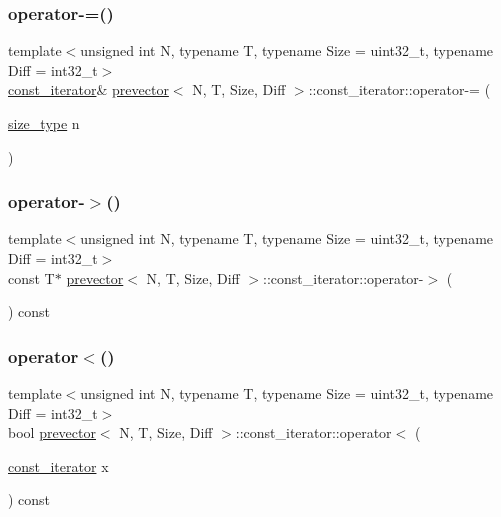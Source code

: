 \subsubsection{\texorpdfstring{operator-\/=()}{operator-=()}}
{\footnotesize\ttfamily template$<$unsigned int N, typename T, typename Size = uint32\+\_\+t, typename Diff = int32\+\_\+t$>$ \\
\mbox{\hyperlink{classprevector_1_1const__iterator}{const\+\_\+iterator}}\& \mbox{\hyperlink{classprevector}{prevector}}$<$ N, T, Size, Diff $>$\+::const\+\_\+iterator\+::operator-\/= (\begin{DoxyParamCaption}\item[{\mbox{\hyperlink{classprevector_a7e0da95e6d1c878f6eeb572f4fc12524}{size\+\_\+type}}}]{n }\end{DoxyParamCaption})\hspace{0.3cm}{\ttfamily [inline]}}

\mbox{\label{classprevector_1_1const__iterator_ae3f7014dba7dfa630b1f094bb53074ac}} 
\subsubsection{\texorpdfstring{operator-\/$>$()}{operator->()}}
{\footnotesize\ttfamily template$<$unsigned int N, typename T, typename Size = uint32\+\_\+t, typename Diff = int32\+\_\+t$>$ \\
const T$\ast$ \mbox{\hyperlink{classprevector}{prevector}}$<$ N, T, Size, Diff $>$\+::const\+\_\+iterator\+::operator-\/$>$ (\begin{DoxyParamCaption}{ }\end{DoxyParamCaption}) const\hspace{0.3cm}{\ttfamily [inline]}}

\mbox{\label{classprevector_1_1const__iterator_a2cdb51fc23c60a20dc5e954f6cc2a127}} 
\subsubsection{\texorpdfstring{operator$<$()}{operator<()}}
{\footnotesize\ttfamily template$<$unsigned int N, typename T, typename Size = uint32\+\_\+t, typename Diff = int32\+\_\+t$>$ \\
bool \mbox{\hyperlink{classprevector}{prevector}}$<$ N, T, Size, Diff $>$\+::const\+\_\+iterator\+::operator$<$ (\begin{DoxyParamCaption}\item[{\mbox{\hyperlink{classprevector_1_1const__iterator}{const\+\_\+iterator}}}]{x }\end{DoxyParamCaption}) const\hspace{0.3cm}{\ttfamily [inline]}}

